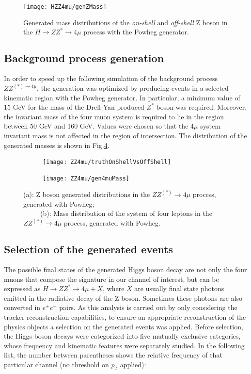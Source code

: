 \documentclass[a4paper,twoside,12pt]{book}
\begin{document}
\begin{figure}
\centering
  \texttt{[image: HZZ4mu/genZMass]}
  \caption{Generated mass distributions of the \textit{on-shell} and \textit{off-shell} Z boson 
  in the $H \rightarrow ZZ^{*} \rightarrow 4\mu$ process with the Powheg generator.}
\label{fig:HZZ4mu:generatedZMass}
\end{figure}

\subsection{Background process generation}\label{physics:bkgGeneration}
In order to speed up the following simulation of the background process $ZZ^{(*) \rightarrow 4\mu}$, the generation was optimized by
producing events in a selected kinematic region with the Powheg generator\cite{Powheg}. In particular, a minimum value of 15 GeV for the mass of
the Drell-Yan produced $Z^*$ boson was required. Moreover, the invariant mass of the four muon system is required 
to lie in the region between 50 GeV and 160 GeV. Values were chosen so that the $4\mu$ system invariant mass is not affected in the region of intersection. The distribution of the generated masses is shown 
in Fig.\ref{fig:ZZ4mu:genMasses}.\\

\begin{figure}
\begin{subfigure}{.5\linewidth}
\texttt{[image: ZZ4mu/truthOnShellVsOffShell]}
\caption{}
\label{fig:ZZ4mu:truthOnShellVsOffShell}
\end{subfigure}
\begin{subfigure}{.5\linewidth}
\centering
\texttt{[image: ZZ4mu/gen4muMass]}
\caption{}
\label{fig:ZZ4mu:gen4muMass}
\end{subfigure}
\caption{(a): Z boson generated distributions in the $ZZ^{(*)} \rightarrow 4\mu$ process, generated with Powheg;\\
\ \ \ \ \ (b): Mass distribution of the system of four leptons in the $ZZ^{(*)} \rightarrow 4\mu$ process, generated with Powheg.}
\label{fig:ZZ4mu:genMasses}
\end{figure}


\subsection{Selection of the generated events}
The possible final states of the generated Higgs boson decay are not only the four muons that 
compose the signature in our channel of interest, but can be expressed as $H \rightarrow
ZZ^* \rightarrow 4\mu + X$, where $X$ are usually final state photons emitted in the
radiative decay of the Z boson. Sometimes these photons are also converted in $e^{+}e^{-}$ pairs.
 As this analysis is carried out by only considering the tracker reconstruction capabilities, to ensure 
an appropriate reconstruction of the physics objects a selection on the 
generated events was applied. Before selection, the Higgs boson decays were categorized into five 
mutually exclusive categories, whose frequency and kinematic features were separately 
studied. In the following list, the number between parentheses shows the relative frequency
of that particular channel (no threshold on $p_{T}$ applied):
\end{document}
